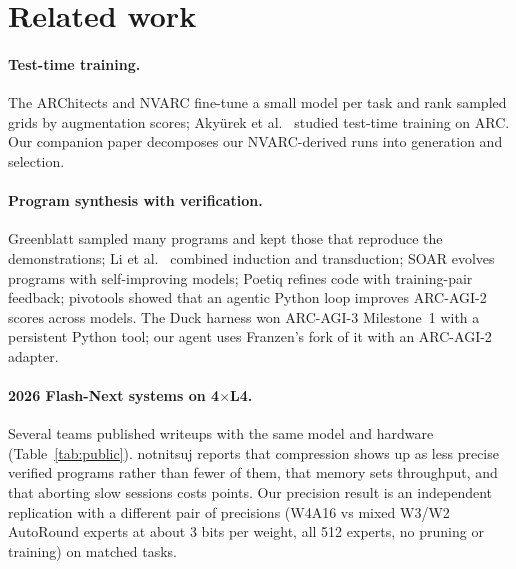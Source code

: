 \documentclass[11pt]{article}
\begin{document}
\section{Related work}
\paragraph{Test-time training.} The ARChitects \cite{architects2024,architectspoe} and NVARC \cite{nvarc2025} fine-tune a small model per task and rank sampled grids by augmentation scores; Aky\"urek et al.\ \cite{akyurek2024} studied test-time training on ARC. Our companion paper \cite{paper1} decomposes our NVARC-derived runs into generation and selection.
\paragraph{Program synthesis with verification.} Greenblatt \cite{greenblatt2024} sampled many programs and kept those that reproduce the demonstrations; Li et al.\ \cite{li2024} combined induction and transduction; SOAR \cite{soar2025} evolves programs with self-improving models; Poetiq \cite{poetiq} refines code with training-pair feedback; pivotools \cite{pivotools2026} showed that an agentic Python loop improves ARC-AGI-2 scores across models. The Duck harness \cite{duck} won ARC-AGI-3 Milestone~1 with a persistent Python tool; our agent uses Franzen's fork of it \cite{duckfork} with an ARC-AGI-2 adapter.
\paragraph{2026 Flash-Next systems on 4$\times$L4.} Several teams published writeups with the same model and hardware (Table~\ref{tab:public}). notnitsuj \cite{notnitsuj2026} reports that compression shows up as less precise verified programs rather than fewer of them, that memory sets throughput, and that aborting slow sessions costs points. Our precision result is an independent replication with a different pair of precisions (W4A16 vs mixed W3/W2 AutoRound experts at about 3 bits per weight, all 512 experts, no pruning or training) on matched tasks.
\end{document}
